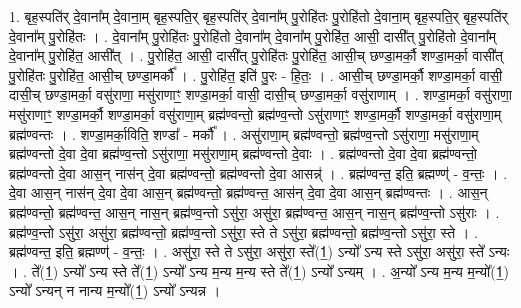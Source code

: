 \documentclass[17pt]{extarticle}
\begin{document}
1. बृह॒स्पति॑र् दे॒वाना᳚म् दे॒वाना॒म् बृह॒स्पति॒र् बृह॒स्पति॑र् दे॒वाना᳚म् पु॒रोहि॑तः पु॒रोहि॑तो दे॒वाना॒म् बृह॒स्पति॒र् बृह॒स्पति॑र् दे॒वाना᳚म् पु॒रोहि॑तः । . दे॒वाना᳚म् पु॒रोहि॑तः पु॒रोहि॑तो दे॒वाना᳚म् दे॒वाना᳚म् पु॒रोहि॑त॒ आसी॒ दासी᳚त् पु॒रोहि॑तो दे॒वाना᳚म् दे॒वाना᳚म् पु॒रोहि॑त॒ आसी᳚त् । . पु॒रोहि॑त॒ आसी॒ दासी᳚त् पु॒रोहि॑तः पु॒रोहि॑त॒ आसी॒च् छण्डा॒मर्कौ॒ शण्डा॒मर्का॒ वासी᳚त् पु॒रोहि॑तः पु॒रोहि॑त॒ आसी॒च् छण्डा॒मर्कौ᳚ । . पु॒रोहि॑त॒ इति॑ पु॒रः - हि॒तः॒ । . आसी॒च् छण्डा॒मर्कौ॒ शण्डा॒मर्का॒ वासी॒ दासी॒च् छण्डा॒मर्का॒ वसु॑राणा॒ मसु॑राणाꣳ॒॒ शण्डा॒मर्का॒ वासी॒ दासी॒च् छण्डा॒मर्का॒ वसु॑राणाम् । . शण्डा॒मर्का॒ वसु॑राणा॒ मसु॑राणाꣳ॒॒ शण्डा॒मर्कौ॒ शण्डा॒मर्का॒ वसु॑राणा॒म् ब्रह्म॑ण्वन्तो॒ ब्रह्म॑ण्व॒न्तो ऽसु॑राणाꣳ॒॒ शण्डा॒मर्कौ॒ शण्डा॒मर्का॒ वसु॑राणा॒म् ब्रह्म॑ण्वन्तः । . शण्डा॒मर्का॒विति॒ शण्डा᳚ - मर्कौ᳚ । . असु॑राणा॒म् ब्रह्म॑ण्वन्तो॒ ब्रह्म॑ण्व॒न्तो ऽसु॑राणा॒ मसु॑राणा॒म् ब्रह्म॑ण्वन्तो दे॒वा दे॒वा ब्रह्म॑ण्व॒न्तो ऽसु॑राणा॒ मसु॑राणा॒म् ब्रह्म॑ण्वन्तो दे॒वाः । . ब्रह्म॑ण्वन्तो दे॒वा दे॒वा ब्रह्म॑ण्वन्तो॒ ब्रह्म॑ण्वन्तो दे॒वा आस॒न् नास॑न् दे॒वा ब्रह्म॑ण्वन्तो॒ ब्रह्म॑ण्वन्तो दे॒वा आसन्न्॑ । . ब्रह्म॑ण्वन्त॒ इति॒ ब्रह्मण्ण्॑ - व॒न्तः॒ । . दे॒वा आस॒न् नास॑न् दे॒वा दे॒वा आस॒न् ब्रह्म॑ण्वन्तो॒ ब्रह्म॑ण्वन्त॒ आस॑न् दे॒वा दे॒वा आस॒न् ब्रह्म॑ण्वन्तः । . आस॒न् ब्रह्म॑ण्वन्तो॒ ब्रह्म॑ण्वन्त॒ आस॒न् नास॒न् ब्रह्म॑ण्व॒न्तो ऽसु॑रा॒ असु॑रा॒ ब्रह्म॑ण्वन्त॒ आस॒न् नास॒न् ब्रह्म॑ण्व॒न्तो ऽसु॑राः । . ब्रह्म॑ण्व॒न्तो ऽसु॑रा॒ असु॑रा॒ ब्रह्म॑ण्वन्तो॒ ब्रह्म॑ण्व॒न्तो ऽसु॑रा॒ स्ते ते ऽसु॑रा॒ ब्रह्म॑ण्वन्तो॒ ब्रह्म॑ण्व॒न्तो ऽसु॑रा॒ स्ते । . ब्रह्म॑ण्वन्त॒ इति॒ ब्रह्मण्ण्॑ - व॒न्तः॒ । . असु॑रा॒ स्ते ते ऽसु॑रा॒ असु॑रा॒ स्ते᳚(1॒) ऽन्यो᳚ ऽन्य स्ते ऽसु॑रा॒ असु॑रा॒ स्ते᳚ ऽन्यः । . ते᳚(1॒) ऽन्यो᳚ ऽन्य स्ते ते᳚(1॒) ऽन्यो᳚ ऽन्य म॒न्य म॒न्य स्ते ते᳚(1॒) ऽन्यो᳚ ऽन्यम् । . अ॒न्यो᳚ ऽन्य म॒न्य म॒न्यो᳚(1॒) ऽन्यो᳚ ऽन्यन् न नान्य म॒न्यो᳚(1॒) ऽन्यो᳚ ऽन्यन्न । \newline
\end{document}

